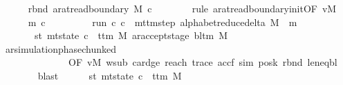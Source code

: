 \begin{isabellebody}
\ \ \ \ \isamarkupfalse%
\ rbnd{\isacharcolon}{\kern0pt}\ {\isachardoublequoteopen}ar{\isacharunderscore}{\kern0pt}at{\isacharunderscore}{\kern0pt}read{\isacharunderscore}{\kern0pt}boundary\ M\ {\isacharquery}{\kern0pt}c{\isacharprime}{\kern0pt}{\isachardoublequoteclose}\isanewline
\ \ \ \ \ \ \isamarkupfalse%
\ {\isacharparenleft}{\kern0pt}rule\ ar{\isacharunderscore}{\kern0pt}at{\isacharunderscore}{\kern0pt}read{\isacharunderscore}{\kern0pt}boundary{\isacharunderscore}{\kern0pt}init{\isacharbrackleft}{\kern0pt}OF\ vM{\isacharbrackright}{\kern0pt}{\isacharparenright}{\kern0pt}\isanewline
\ \ \ \ \isamarkupfalse%
\ m\ c{\isacharprime}{\kern0pt}{\isacharprime}{\kern0pt}\ \isanewline
\ \ \ \ \ \ \ \ run{\isacharcolon}{\kern0pt}\ {\isachardoublequoteopen}{\isacharparenleft}{\kern0pt}{\isacharquery}{\kern0pt}c{\isacharprime}{\kern0pt}{\isacharcomma}{\kern0pt}\ c{\isacharprime}{\kern0pt}{\isacharprime}{\kern0pt}{\isacharparenright}{\kern0pt}\ {\isasymin}\ {\isacharparenleft}{\kern0pt}mttm{\isacharunderscore}{\kern0pt}step\ {\isacharparenleft}{\kern0pt}alphabet{\isacharunderscore}{\kern0pt}reduce{\isacharunderscore}{\kern0pt}delta\ M{\isacharparenright}{\kern0pt}{\isacharparenright}{\kern0pt}\ {\isacharcircum}{\kern0pt}{\isacharcircum}{\kern0pt}\ m{\isachardoublequoteclose}\isanewline
\ \ \ \ \ \ \ st{\isacharprime}{\kern0pt}{\isacharprime}{\kern0pt}{\isacharcolon}{\kern0pt}\ {\isachardoublequoteopen}mt{\isacharunderscore}{\kern0pt}state\ c{\isacharprime}{\kern0pt}{\isacharprime}{\kern0pt}\ {\isacharequal}{\kern0pt}\ {\isacharparenleft}{\kern0pt}t{\isacharunderscore}{\kern0pt}tm\ M{\isacharcomma}{\kern0pt}\ ar{\isacharunderscore}{\kern0pt}accept{\isacharunderscore}{\kern0pt}stage\ {\isacharparenleft}{\kern0pt}bl{\isacharunderscore}{\kern0pt}tm\ M{\isacharparenright}{\kern0pt}{\isacharparenright}{\kern0pt}{\isachardoublequoteclose}\isanewline
\ \ \ \ \ \ \isamarkupfalse%
\ ar{\isacharunderscore}{\kern0pt}simulation{\isacharunderscore}{\kern0pt}phase{\isacharunderscore}{\kern0pt}chunked\isanewline
\ \ \ \ \ \ \ \ \ \ \ \ \ \ {\isacharbrackleft}{\kern0pt}OF\ vM\ w{\isacharunderscore}{\kern0pt}sub\ card{\isacharunderscore}{\kern0pt}ge\ reach{}\ trace\ accf\ sim\ posk\ rbnd\ le{\isacharunderscore}{\kern0pt}neq{\isacharunderscore}{\kern0pt}bl{\isacharbrackright}{\kern0pt}\isanewline
\ \ \ \ \ \ \isamarkupfalse%
\ blast\isanewline
\ \ \ \ \isamarkupfalse%
\ st{}{\isacharcolon}{\kern0pt}\ {\isachardoublequoteopen}mt{\isacharunderscore}{\kern0pt}state\ c{\isacharprime}{\kern0pt}{\isacharprime}{\kern0pt}\ {\isacharequal}{\kern0pt}\ t{\isacharunderscore}{\kern0pt}tm\ {\isacharquery}{\kern0pt}M{\isacharprime}{\kern0pt}{\isachardoublequoteclose}\ \isamarkupfalse%

\end{isabellebody}
